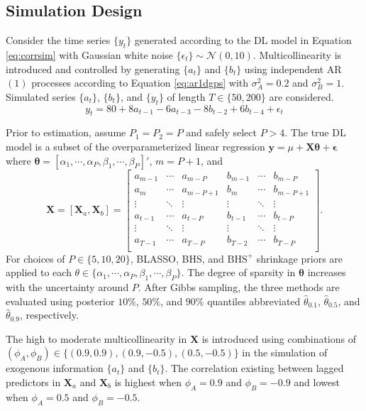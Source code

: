 \subsection{Simulation Design}
Consider the time series $\{y_t\}$ generated according to the DL model in Equation \ref{eq:corrsim} with Gaussian white noise $\{\epsilon_t\}\sim\mathcal{N}(0,10)$. Multicollinearity is introduced and controlled by generating $\{a_t\}$ and $\{b_t\}$ using independent AR$(1)$ processes according to Equation \ref{eq:ar1dgps} with $\sigma^2_A=0.2$ and $\sigma^2_B=1$. Simulated series $\{a_t\}$, $\{b_t\}$, and $\{y_t\}$ of length $T \in \{50,200\}$ are considered.
\begin{equation}
\label{eq:corrsim}
 y_t=80+8a_{t-1}-6a_{t-3}-8b_{t-2}+6b_{t-4}+\epsilon_t
\end{equation}

Prior to estimation, assume $P_1=P_2=P$ and safely select $P > 4$. The true DL model is a subset of the overparameterized linear regression $\bm{y}=\mu+\bm{X}\bm{\theta}+\bm{\epsilon}$ where $\bm{\theta}=[\alpha_1,\cdots,\alpha_P,\beta_1,\cdots,\beta_P]'$, $m=P+1$, and
\begin{equation*}
\bm{X}=[\bm{X}_a,\bm{X}_b]=
	\begin{bmatrix} a_{m-1} & \cdots & a_{m-P} &
					b_{m-1} & \cdots & b_{m-P} \\
					a_{m} & \cdots & a_{m-P+1} &
					b_{m} & \cdots & b_{m-P+1} \\
					\vdots & \ddots & \vdots &
					\vdots &  \ddots & \vdots  \\
					a_{t-1} & \cdots & a_{t-P} &
					b_{t-1} & \cdots & b_{t-P} \\
					\vdots & \ddots & \vdots &
					\vdots &  \ddots & \vdots  \\
					a_{T-1} & \cdots & a_{T-P} &
					b_{T-2} & \cdots & b_{T-P} \\
	\end{bmatrix} .
\end{equation*}
For choices of $P\in\{5,10,20\}$, BLASSO, BHS, and $\textrm{BHS}^+$ shrinkage priors are applied to each $\theta \in \{\alpha_1,\cdots,\alpha_P,\beta_1,\cdots,\beta_P\}$. The degree of sparsity in $\bm{\theta}$ increases with the uncertainty around $P$.  After Gibbs sampling, the three methods are evaluated using posterior $10\%$, $50\%$, and $90\%$ quantiles abbreviated $\hat{\theta}_{0.1}$, $\hat{\theta}_{0.5}$, and $\hat{\theta}_{0.9}$, respectively.

The high to moderate multicollinearity in $\bm{X}$ is introduced using combinations of $(\phi_A,\phi_B) \in \{(0.9,0.9),(0.9,-0.5),(0.5,-0.5)\}$ in the simulation of exogenous information $\{a_t\}$ and $\{b_t\}$. The correlation existing between lagged predictors in $\bm{X}_a$ and $\bm{X}_b$ is highest when $\phi_A=0.9$ and $\phi_B=-0.9$ and lowest when $\phi_A=0.5$ and $\phi_B=-0.5$.

